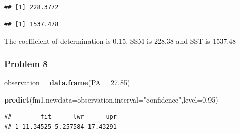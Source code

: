 \documentclass[
]{article}
\newenvironment{Shaded}{\begin{snugshade}}{\end{snugshade}}
\newcommand{\AttributeTok}[1]{\textcolor[rgb]{0.13,0.29,0.53}{#1}}
\newcommand{\DecValTok}[1]{\textcolor[rgb]{0.00,0.00,0.81}{#1}}
\newcommand{\FloatTok}[1]{\textcolor[rgb]{0.00,0.00,0.81}{#1}}
\newcommand{\FunctionTok}[1]{\textcolor[rgb]{0.13,0.29,0.53}{\textbf{#1}}}
\newcommand{\NormalTok}[1]{#1}
\newcommand{\OtherTok}[1]{\textcolor[rgb]{0.56,0.35,0.01}{#1}}
\newcommand{\SpecialCharTok}[1]{\textcolor[rgb]{0.81,0.36,0.00}{\textbf{#1}}}
\newcommand{\StringTok}[1]{\textcolor[rgb]{0.31,0.60,0.02}{#1}}
\begin{document}
\begin{Shaded}
\end{Shaded}

\begin{verbatim}
## [1] 228.3772
\end{verbatim}

\begin{Shaded}
\end{Shaded}

\begin{verbatim}
## [1] 1537.478
\end{verbatim}

The coefficient of determination is 0.15. SSM is 228.38 and SST is
1537.48

\hypertarget{problem-8}{%
\subsubsection{Problem 8}\label{problem-8}}

\begin{Shaded}
\begin{Highlighting}[]
\NormalTok{observation }\OtherTok{=} \FunctionTok{data.frame}\NormalTok{(}\AttributeTok{PA =} \FloatTok{27.85}\NormalTok{)}

\FunctionTok{predict}\NormalTok{(fm1,}\AttributeTok{newdata=}\NormalTok{observation,}\AttributeTok{interval=}\StringTok{"confidence"}\NormalTok{,}\AttributeTok{level=}\FloatTok{0.95}\NormalTok{)}
\end{Highlighting}
\end{Shaded}

\begin{verbatim}
##        fit      lwr      upr
## 1 11.34525 5.257584 17.43291
\end{verbatim}
\end{document}
